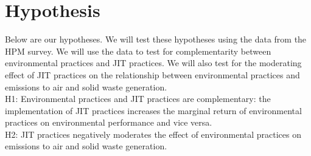 \section{Hypothesis}
Below are our hypotheses. We will test these hypotheses using the data from the HPM survey. We will use the data to test for complementarity between environmental practices and JIT practices. We will also test for the moderating effect of JIT practices on the relationship between environmental practices and emissions to air and solid waste generation.
\\

H1: Environmental practices and JIT practices are complementary: the implementation of JIT practices increases the marginal return of environmental practices on environmental performance and vice versa.
\\

H2: JIT practices negatively moderates the effect of environmental practices on emissions to air and solid waste generation.

